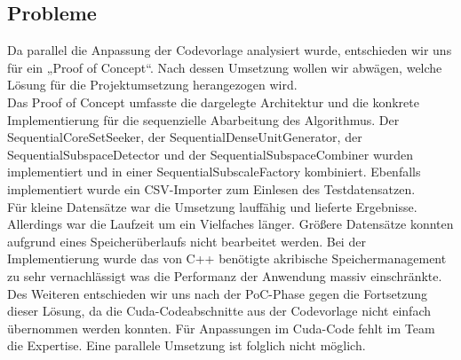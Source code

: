 \subsection{Probleme}
Da parallel die Anpassung der Codevorlage analysiert wurde, entschieden wir uns für ein „Proof of Concept“. Nach dessen Umsetzung wollen wir abwägen, welche Lösung für die Projektumsetzung herangezogen wird.\\
Das Proof of Concept umfasste die dargelegte Architektur und die konkrete Implementierung für die sequenzielle Abarbeitung des Algorithmus. Der SequentialCoreSetSeeker, der SequentialDenseUnitGenerator, der SequentialSubspaceDetector und der SequentialSubspaceCombiner wurden implementiert und in einer SequentialSubscaleFactory kombiniert. Ebenfalls implementiert wurde ein CSV-Importer zum Einlesen des Testdatensatzen.\\
Für kleine Datensätze war die Umsetzung lauffähig und lieferte Ergebnisse. Allerdings war die Laufzeit um ein Vielfaches länger. Größere Datensätze konnten aufgrund eines Speicherüberlaufs nicht bearbeitet werden. Bei der Implementierung wurde das von C++ benötigte akribische Speichermanagement zu sehr vernachlässigt was die Performanz der Anwendung massiv einschränkte.\\
Des Weiteren entschieden wir uns nach der PoC-Phase gegen die Fortsetzung dieser Lösung, da die Cuda-Codeabschnitte aus der Codevorlage nicht einfach übernommen werden konnten. Für Anpassungen im Cuda-Code fehlt im Team die Expertise. Eine parallele Umsetzung ist folglich nicht möglich.